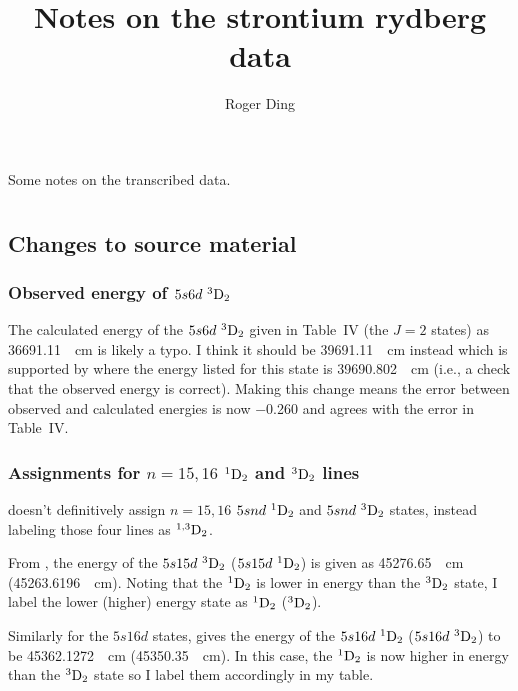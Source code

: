 \documentclass{article}
\title{Notes on the strontium rydberg data}
\author{Roger Ding}
\newcommand{\tsup}{\textsuperscript}													%
\newcommand{\tsub}{\textsubscript}														%
\newcommand{\SLJ}[3]{\tsup{#1}\textnormal{#2}\tsub{#3}}
\newcommand{\nSLJ}[4]{{#1}\textnormal{ }\SLJ{#2}{#3}{#4}}
\begin{document}
\maketitle


Some notes on the transcribed data.

\section{}

\subsection{Changes to source material}

\subsubsection{Observed energy of $\nSLJ{5s6d}{3}{D}{2}$}

The calculated energy of the $\nSLJ{5s6d}{3}{D}{2}$ given in Table~IV (the ${J=2}$ states) as \SI{36691.11}{\per\cm} is likely a typo. I think it should be \SI{39691.11}{\per\cm} instead which is supported by \cite{san_2010} where the energy listed for this state is \SI{39690.802}{\per\cm} (i.e., a check that the observed energy is correct). Making this change means the error between observed and calculated energies is now \num{-0.260} and agrees with the error in Table~IV.

\subsubsection{Assignments for ${n=15,16}$ ${\SLJ{1}{D}{2}}$ and ${\SLJ{3}{D}{2}}$ lines}

\citeauthor{esh_1977} doesn't definitively assign ${n=15,16}$ ${\nSLJ{5snd}{1}{D}{2}}$ and ${\nSLJ{5snd}{3}{D}{2}}$ states, instead labeling those four lines as ${\SLJ{1,3}{D}{2}}$.

From \cite{san_2010}, the energy of the ${\nSLJ{5s15d}{3}{D}{2}}$ (${\nSLJ{5s15d}{1}{D}{2}}$) is given as \SI{45276.65}{\per\cm} (\SI{45263.6196}{\per\cm}). Noting that the $\SLJ{1}{D}{2}$ is lower in energy than the $\SLJ{3}{D}{2}$ state, I label the lower (higher) energy state as $\SLJ{1}{D}{2}$ ($\SLJ{3}{D}{2}$).

Similarly for the $5s16d$ states, \cite{san_2010} gives the energy of the $\nSLJ{5s16d}{1}{D}{2}$ ($\nSLJ{5s16d}{3}{D}{2}$) to be \SI{45362.1272}{\per\cm} (\SI{45350.35}{\per\cm}). In this case, the $\SLJ{1}{D}{2}$ is now higher in energy than the $\SLJ{3}{D}{2}$ state so I label them accordingly in my table.
\end{document}
